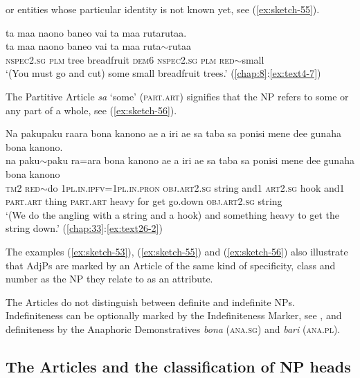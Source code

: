 \documentclass[output=paper]{langscibook}
\begin{document}
\noindent or entities whose particular identity is not known yet, see (\ref{ex:sketch-55}).

\ea\label{ex:sketch-55}
    ta maa naono baneo vai ta maa rutarutaa.\\
    \gll ta	maa	naono	baneo	vai	ta	maa	ruta{$\sim$}rutaa\\
    \textsc{nspec}2.\textsc{sg}	\textsc{plm}	tree	breadfruit	\textsc{dem}6	\textsc{nspec}2.\textsc{sg}	\textsc{plm}	\textsc{red}{$\sim$}small\\
    \glt `(You must go and cut) some small breadfruit trees.' (\ref{chap:8}:\ref{ex:text4-7})
\z

The Partitive Article \textit{sa} `some' (\textsc{part}.\textsc{art}) signifies that the NP refers to some or any part of a whole, see (\ref{ex:sketch-56}).

\ea\label{ex:sketch-56}
    Na pakupaku raara bona kanono ae a iri ae sa taba sa ponisi mene dee gunaha bona kanono.\\
    \gll na	paku{$\sim$}paku	ra=ara	bona	kanono	ae	a	iri	ae	sa	taba	sa	ponisi	mene	dee	gunaha	bona	kanono\\
    \textsc{tm}2	\textsc{red}{$\sim$}do	1\textsc{pl}.\textsc{in}.\textsc{ipfv}=1\textsc{pl}.\textsc{in}.\textsc{pron}	\textsc{obj}.\textsc{art}2.\textsc{sg}	string	and1	\textsc{art}2.\textsc{sg}	hook	and1	\textsc{part}.\textsc{art}	thing	\textsc{part}.\textsc{art}	heavy	for	get	go.down	\textsc{obj}.\textsc{art}2.\textsc{sg}	string\\
    \glt `(We do the angling with a string and a hook) and something heavy to get the string down.' (\ref{chap:33}:\ref{ex:text26-2})
\z

The examples (\ref{ex:sketch-53}), (\ref{ex:sketch-55}) and (\ref{ex:sketch-56}) also illustrate that AdjPs are marked by an Article of the same kind of specificity, class and number as the NP they relate to as an attribute.

The Articles do not distinguish between definite and indefinite NPs. Indefiniteness can be optionally marked by the Indefiniteness Marker, see , and definiteness by the Anaphoric Demonstratives \textit{bona} (\textsc{ana}.\textsc{sg}) and \textit{bari} (\textsc{ana}.\textsc{pl}).

\subsection{The Articles and the classification of NP heads}\label{sec:classnphead}
\end{document}

